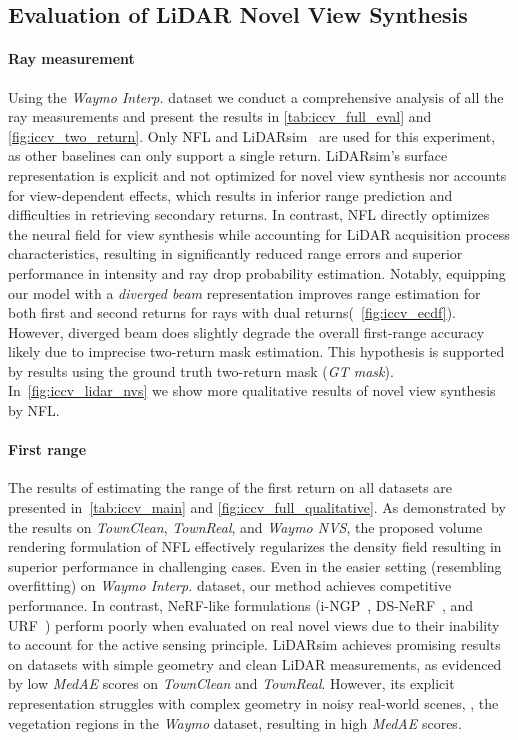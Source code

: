 \subsection{Evaluation of LiDAR Novel View Synthesis}
\label{sec:lidar_nvs_eval}

\paragraph{Ray measurement}
Using the \emph{Waymo Interp.} dataset we conduct a comprehensive analysis of all the ray measurements and present the results in \cref{tab:iccv_full_eval} and \cref{fig:iccv_two_return}. Only NFL and LiDARsim~\cite{manivasagam2020lidarsim} are used for this experiment, as other baselines can only support a single return. 
LiDARsim's surface representation is explicit and not optimized for novel view synthesis nor accounts for view-dependent effects, which results in inferior range prediction and difficulties in retrieving secondary returns. In contrast, NFL directly optimizes the neural field for view synthesis while accounting for LiDAR acquisition process characteristics, resulting in significantly reduced range errors and superior performance in intensity and ray drop probability estimation. Notably, equipping our model with a \textit{diverged beam} representation improves range estimation for both first and second returns for rays with dual returns(\cf ~\cref{fig:iccv_ecdf}). However, diverged beam does slightly degrade the overall first-range accuracy likely due to imprecise two-return mask estimation. This hypothesis is supported by results using the ground truth two-return mask (\textit{GT mask}). In~\cref{fig:iccv_lidar_nvs} we show more qualitative results of novel view synthesis by NFL.


\paragraph{First range}
The results of estimating the range of the first return on all datasets are presented in~\cref{tab:iccv_main} and \cref{fig:iccv_full_qualitative}. As demonstrated by the results on \textit{TownClean}, \textit{TownReal}, and \textit{Waymo NVS}, the proposed volume rendering formulation of NFL effectively regularizes the density field resulting in superior performance in challenging cases. Even in the easier setting (resembling overfitting) on \textit{Waymo Interp.} dataset, our method achieves competitive performance. In contrast, NeRF-like formulations (i-NGP~\cite{mueller2022instant}, DS-NeRF~\cite{deng2021depth}, and URF~\cite{rematas2021urban}) perform poorly when evaluated on real novel views due to their inability to account for the active sensing principle. LiDARsim achieves promising results on datasets with simple geometry and clean LiDAR measurements, as evidenced by low \textit{MedAE} scores on \textit{TownClean} and \textit{TownReal}. However, its explicit representation struggles with complex geometry in noisy real-world scenes, \eg, the vegetation regions in the \textit{Waymo} dataset, resulting in high \textit{MedAE} scores.


